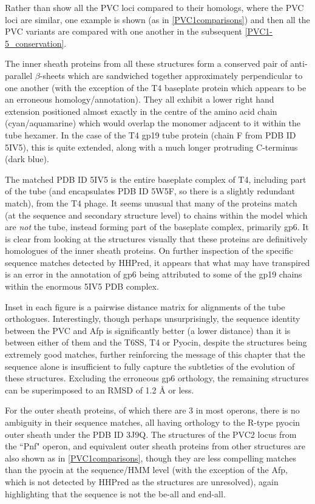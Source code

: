 Rather than show all the PVC loci compared to their homologs, where the PVC loci are similar, one example is shown (as in \vref{PVC1comparisons}) and then all the PVC variants are compared with one another in the subsequent \vref{PVC1-5_conservation}.

The inner sheath proteins from all these structures form a conserved pair of anti-parallel $\beta$-sheets which are sandwiched together approximately perpendicular to one another (with the exception of the T4 baseplate protein which appears to be an erroneous homology/annotation). They all exhibit a lower right hand extension positioned almost exactly in the centre of the amino acid chain (cyan/aquamarine) which would overlap the monomer adjacent to it within the tube hexamer. In the case of the T4 gp19 tube protein (chain F from PDB ID 5IV5), this is quite extended, along with a much longer protruding C-terminus (dark blue).

The matched PDB ID 5IV5 is the entire baseplate complex of T4, including part of the tube (and encapsulates PDB ID 5W5F, so there is a slightly redundant match), from the T4 phage. It seems unusual that many of the proteins match (at the sequence and secondary structure level) to chains within the model which are \emph{not} the tube, instead forming part of the baseplate complex, primarily gp6. It is clear from looking at the structures visually that these proteins are definitively homologues of the inner sheath proteins. On further inspection of the specific sequence matches detected by HHPred, it appears that what may have transpired is an error in the annotation of gp6 being attributed to some of the gp19 chains within the enormous 5IV5 PDB complex.

Inset in each figure is a pairwise distance matrix for alignments of the tube orthologues. Interestingly, though perhaps unsurprisingly, the sequence identity between the PVC and Afp is significantly better (a lower distance) than it is between either of them and the T6SS, T4 or Pyocin, despite the structures being extremely good matches, further reinforcing the message of this chapter that the sequence alone is insufficient to fully capture the subtleties of the evolution of these structures. Excluding the erroneous gp6 orthology, the remaining structures can be superimposed to an RMSD of 1.2 \AA{} or less.

For the outer sheath proteins, of which there are 3 in most operons, there is no ambiguity in their sequence matches, all having orthology to the R-type pyocin outer sheath under the PDB ID 3J9Q. The structures of the PVC2 locus from the ``Pnf" operon, and equivalent outer sheath proteins from other structures are also shown as in \vref{PVC1comparisons}, though they are less compelling matches than the pyocin at the sequence/HMM level (with the exception of the Afp, which is not detected by HHPred as the structures are unresolved), again highlighting that the sequence is not the be-all and end-all.

